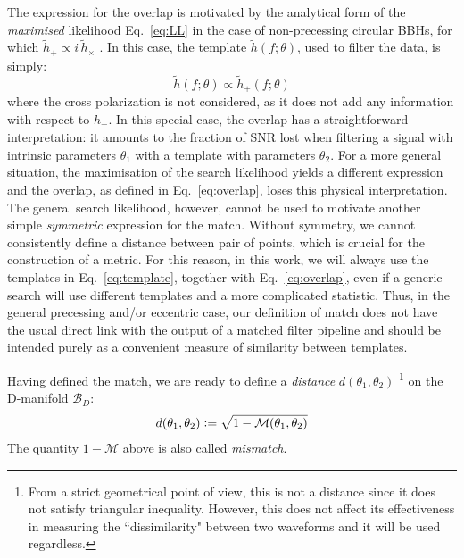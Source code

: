 \documentclass[twocolumn,showpacs,preprintnumbers,nofootinbib,prd,
superscriptaddress,10pt]{revtex4-2}
\begin{document}
The expression for the overlap is motivated by the analytical form of the {\it maximised} likelihood Eq.~\eqref{eq:LL} in the case of non-precessing circular BBHs, for which ${\tilde{h}_+ \propto i \, \tilde{h}_\times}$ \cite[Eq.~(14)]{Harry:2016ijz}.
In this case, the template $\tilde{h}(f; \theta)$, used to filter the data, is simply:
\begin{equation} \label{eq:template}
	\tilde{h}(f; \theta) \propto \tilde{h}_+(f; \theta)
\end{equation}
where the cross polarization is not considered, as it does not add any information with respect to $h_+$.
In this special case, the overlap has a straightforward interpretation: it amounts to the fraction of SNR lost when filtering a signal with intrinsic parameters $\theta_1$ with a template with parameters $\theta_2$.
For a more general situation, the maximisation of the search likelihood yields a different expression \cite{Harry:2016ijz, Harry:2017weg} and the overlap, as defined in Eq.~\ref{eq:overlap}, loses this physical interpretation. The general search likelihood, however, cannot be used to motivate another simple {\it symmetric} expression for the match. Without symmetry, we cannot consistently define a distance between pair of points, which is crucial for the construction of a metric.
For this reason, in this work, we will always use the templates in Eq.~\eqref{eq:template}, together with Eq.~\eqref{eq:overlap}, even if a generic search will use different templates and a more complicated statistic.
Thus, in the general precessing and/or eccentric case, our definition of match does not have the usual direct link with the output of a matched filter pipeline and should be intended purely as a convenient measure of similarity between templates.

Having defined the match, we are ready to define a {\it distance} $d(\theta_1,\theta_2)$ \footnote{
From a strict geometrical point of view, this is not a distance since it does not satisfy triangular inequality. However, this does not affect its effectiveness in measuring the ``dissimilarity" between two waveforms and it will be used regardless.}
on the D-manifold $\mathcal{B}_D$:
\begin{align}\label{eq:distance}
	d(\theta_1,\theta_2) \vcentcolon= \sqrt{1 - \mathcal{M}(\theta_1,\theta_2)}
\end{align}
The quantity $1-\mathcal{M}$ above is also called {\it mismatch}.
\end{document}
